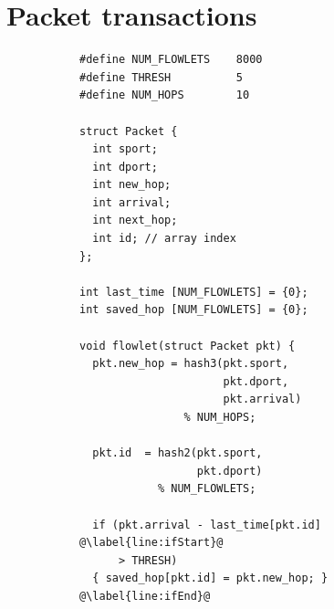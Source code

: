 \section{Packet transactions}
\label{s:transactions}

\begin{figure}[!t]
\begin{subfigure}{0.6\textwidth}
\begin{small}
\begin{lstlisting}[style=customc]
#define NUM_FLOWLETS    8000
#define THRESH          5
#define NUM_HOPS        10

struct Packet {
  int sport;
  int dport;
  int new_hop;
  int arrival;
  int next_hop;
  int id; // array index
};

int last_time [NUM_FLOWLETS] = {0};
int saved_hop [NUM_FLOWLETS] = {0};

void flowlet(struct Packet pkt) {
  pkt.new_hop = hash3(pkt.sport,
                      pkt.dport,
                      pkt.arrival)
                % NUM_HOPS;

  pkt.id  = hash2(pkt.sport,
                  pkt.dport)
            % NUM_FLOWLETS;

  if (pkt.arrival - last_time[pkt.id] @\label{line:ifStart}@
      > THRESH)
  { saved_hop[pkt.id] = pkt.new_hop; } @\label{line:ifEnd}@


\end{lstlisting}
\end{small}
\end{subfigure}
\end{figure}
